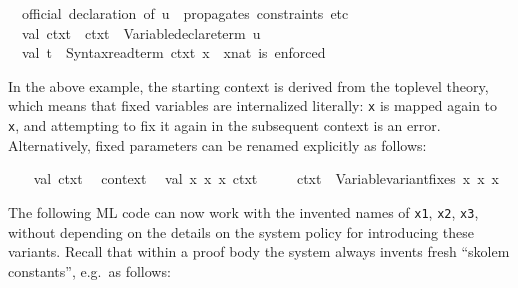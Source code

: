 \begin{isabellebody}
\isanewline
\ \ {\isacharparenleft}{\isacharasterisk}official\ declaration\ of\ u\ {\isacharminus}{\isacharminus}\ propagates\ constraints\ etc{\isachardot}{\isacharasterisk}{\isacharparenright}\isanewline
\ \ val\ ctxt{}\ {\isacharequal}\ ctxt{}\ {\isacharbar}{\isachargreater}\ Variable{\isachardot}declare{\isacharunderscore}term\ u{\isacharsemicolon}\isanewline
\ \ val\ t{}\ {\isacharequal}\ Syntax{\isachardot}read{\isacharunderscore}term\ ctxt{}\ {\isachardoublequote}x{\isachardoublequote}{\isacharsemicolon}\ \ {\isacharparenleft}{\isacharasterisk}x{\isacharcolon}{\isacharcolon}nat\ is\ enforced{\isacharasterisk}{\isacharparenright}\isanewline
{\isacharverbatimclose}%
\endisatagML
{\isafoldML}%
%
\isadelimML
%
\endisadelimML
%
\begin{isamarkuptext}%
In the above example, the starting context is derived from the
  toplevel theory, which means that fixed variables are internalized
  literally: \verb|x| is mapped again to \verb|x|, and
  attempting to fix it again in the subsequent context is an error.
  Alternatively, fixed parameters can be renamed explicitly as
  follows:%
\end{isamarkuptext}%
\isamarkuptrue%
%
\isadelimML
%
\endisadelimML
%
\isatagML
{}\isamarkupfalse%
\ {\isacharverbatimopen}\isanewline
\ \ val\ ctxt{}\ {\isacharequal}\ %
\isaantiq
context%
\endisaantiq
{\isacharsemicolon}\isanewline
\ \ val\ {\isacharparenleft}{\isacharbrackleft}x{}{\isacharcomma}\ x{}{\isacharcomma}\ x{}{\isacharbrackright}{\isacharcomma}\ ctxt{}{\isacharparenright}\ {\isacharequal}\isanewline
\ \ \ \ ctxt{}\ {\isacharbar}{\isachargreater}\ Variable{\isachardot}variant{\isacharunderscore}fixes\ {\isacharbrackleft}{\isachardoublequote}x{\isachardoublequote}{\isacharcomma}\ {\isachardoublequote}x{\isachardoublequote}{\isacharcomma}\ {\isachardoublequote}x{\isachardoublequote}{\isacharbrackright}{\isacharsemicolon}\isanewline
{\isacharverbatimclose}%
\endisatagML
{\isafoldML}%
%
\isadelimML
%
\endisadelimML
%
\begin{isamarkuptext}%
The following ML code can now work with the invented names of
  \verb|x1|, \verb|x2|, \verb|x3|, without depending on
  the details on the system policy for introducing these variants.
  Recall that within a proof body the system always invents fresh
  ``skolem constants'', e.g.\ as follows:%
\end{isamarkuptext}%
\isamarkuptrue%
\isamarkupfalse%

\end{isabellebody}

